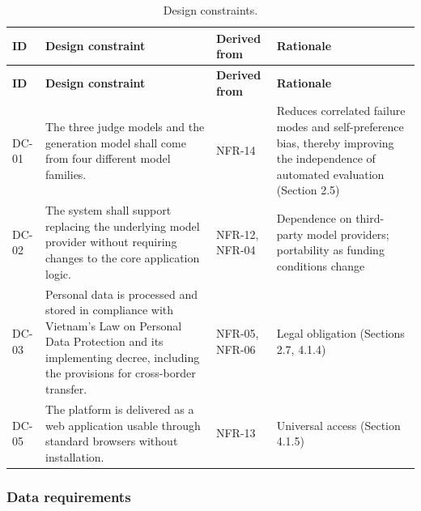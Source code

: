 {\small
\begin{longtable}{|>{\raggedright\arraybackslash}p{}|>{\raggedright\arraybackslash}p{}|>{\raggedright\arraybackslash}p{}|>{\raggedright\arraybackslash}p{}|}
\caption{Design constraints.} \\
\hline
\textbf{ID} & \textbf{Design constraint} & \textbf{Derived from} & \textbf{Rationale} \\ \hline
\endfirsthead
\hline
\textbf{ID} & \textbf{Design constraint} & \textbf{Derived from} & \textbf{Rationale} \\ \hline
\endhead
DC-01 & The three judge models and the generation model shall come from four different model families. & NFR-14 & Reduces correlated failure modes and self-preference bias, thereby improving the independence of automated evaluation (Section 2.5) \\ \hline
DC-02 & The system shall support replacing the underlying model provider without requiring changes to the core application logic. & NFR-12, NFR-04 & Dependence on third-party model providers; portability as funding conditions change \\ \hline
DC-03 & Personal data is processed and stored in compliance with Vietnam's Law on Personal Data Protection and its implementing decree, including the provisions for cross-border transfer. & NFR-05, NFR-06 & Legal obligation (Sections 2.7, 4.1.4) \\ \hline
DC-05 & The platform is delivered as a web application usable through standard browsers without installation. & NFR-13 & Universal access (Section 4.1.5) \\ \hline
\end{longtable}
}

\subsubsection{Data requirements}

